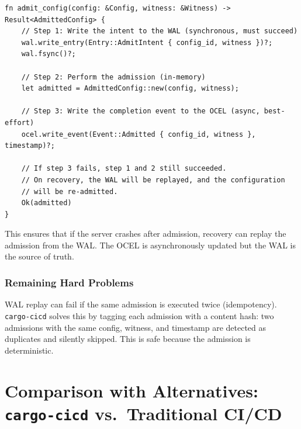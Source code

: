 \begin{lstlisting}[caption={Write-ahead log for OCEL consistency}]
fn admit_config(config: &Config, witness: &Witness) -> Result<AdmittedConfig> {
    // Step 1: Write the intent to the WAL (synchronous, must succeed)
    wal.write_entry(Entry::AdmitIntent { config_id, witness })?;
    wal.fsync()?;

    // Step 2: Perform the admission (in-memory)
    let admitted = AdmittedConfig::new(config, witness);

    // Step 3: Write the completion event to the OCEL (async, best-effort)
    ocel.write_event(Event::Admitted { config_id, witness }, timestamp)?;

    // If step 3 fails, step 1 and 2 still succeeded.
    // On recovery, the WAL will be replayed, and the configuration
    // will be re-admitted.
    Ok(admitted)
}
\end{lstlisting}

This ensures that if the server crashes after admission, recovery can replay the admission from the WAL. The OCEL is asynchronously updated but the WAL is the source of truth.

\subsubsection{Remaining Hard Problems}

WAL replay can fail if the same admission is executed twice (idempotency). \texttt{cargo-cicd} solves this by tagging each admission with a content hash: two admissions with the same config, witness, and timestamp are detected as duplicates and silently skipped. This is safe because the admission is deterministic.

\section{Comparison with Alternatives: \texttt{cargo-cicd} vs.\ Traditional CI/CD}

